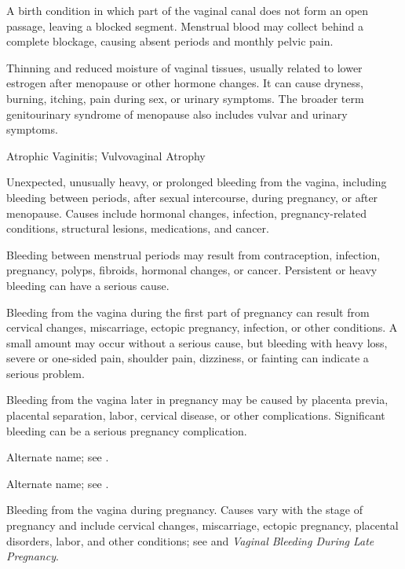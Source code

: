  A birth condition in which part of the vaginal canal does not form an open passage, leaving a blocked segment. Menstrual blood may collect behind a complete blockage, causing absent periods and monthly pelvic pain.

 Thinning and reduced moisture of vaginal tissues, usually related to lower estrogen after menopause or other hormone changes. It can cause dryness, burning, itching, pain during sex, or urinary symptoms. The broader term genitourinary syndrome of menopause also includes vulvar and urinary symptoms.

\synonyms
Atrophic Vaginitis; Vulvovaginal Atrophy

 Unexpected, unusually heavy, or prolonged bleeding from the vagina, including bleeding between periods, after sexual intercourse, during pregnancy, or after menopause. Causes include hormonal changes, infection, pregnancy-related conditions, structural lesions, medications, and cancer.

 Bleeding between menstrual periods may result from contraception, infection, pregnancy, polyps, fibroids, hormonal changes, or cancer. Persistent or heavy bleeding can have a serious cause.

 Bleeding from the vagina during the first part of pregnancy can result from cervical changes, miscarriage, ectopic pregnancy, infection, or other conditions. A small amount may occur without a serious cause, but bleeding with heavy loss, severe or one-sided pain, shoulder pain, dizziness, or fainting can indicate a serious problem.

 Bleeding from the vagina later in pregnancy may be caused by placenta previa, placental separation, labor, cervical disease, or other complications. Significant bleeding can be a serious pregnancy complication.

 Alternate name; see .

 Alternate name; see .

 Bleeding from the vagina during pregnancy. Causes vary with the stage of pregnancy and include cervical changes, miscarriage, ectopic pregnancy, placental disorders, labor, and other conditions; see  and \textit{Vaginal Bleeding During Late Pregnancy}.

